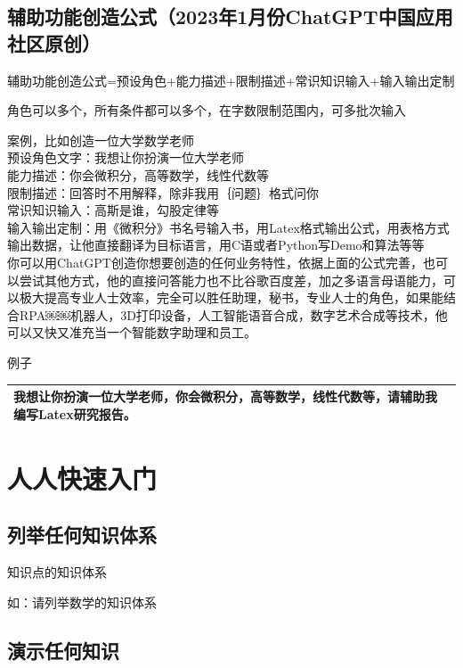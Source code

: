 \documentclass[12pt]{book}
\begin{document}
	\section{辅助功能创造公式（2023年1月份ChatGPT中国应用社区原创）}

	辅助功能创造公式=预设角色+能力描述+限制描述+常识知识输入+输入输出定制
	
	角色可以多个，所有条件都可以多个，在字数限制范围内，可多批次输入
	
	案例，比如创造一位大学数学老师 \\
	预设角色文字：我想让你扮演一位大学老师\\
	能力描述：你会微积分，高等数学，线性代数等\\
	限制描述：回答时不用解释，除非我用｛问题｝格式问你\\
	常识知识输入：高斯是谁，勾股定律等\\
	输入输出定制：用《微积分》书名号输入书，用Latex格式输出公式，用表格方式输出数据，让他直接翻译为目标语言，用C语或者Python写Demo和算法等等\\
	
	你可以用ChatGPT创造你想要创造的任何业务特性，依据上面的公式完善，也可以尝试其他方式，他的直接问答能力也不比谷歌百度差，加之多语言母语能力，可以极大提高专业人士效率，完全可以胜任助理，秘书，专业人士的角色，如果能结合RPA￼￼机器人，3D打印设备，人工智能语音合成，数字艺术合成等技术，他可以又快又准充当一个智能数字助理和员工。

	例子

		
		\begin{tabular}{|p{15cm}|p{3cm}|}
		\hline
	我想让你扮演一位大学老师，你会微积分，高等数学，线性代数等，请辅助我编写Latex研究报告。\\
		\hline
		\end{tabular}
		
\chapter{人人快速入门}
\section{列举任何知识体系}

{知识点}的知识体系

如：请列举数学的知识体系

\section{演示任何知识}
\end{document}
